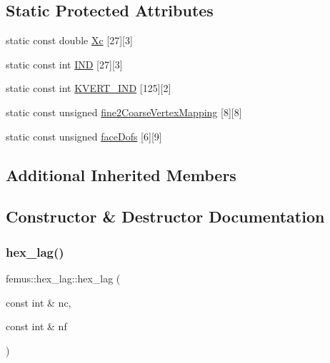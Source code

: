 \subsection*{Static Protected Attributes}
\begin{DoxyCompactItemize}
\item 
static const double \mbox{\hyperlink{classfemus_1_1hex__lag_a09e66c005d5c3e270006ef1694667f2f}{Xc}} \mbox{[}27\mbox{]}\mbox{[}3\mbox{]}
\item 
static const int \mbox{\hyperlink{classfemus_1_1hex__lag_aecbc5fe6a0428eeb352acb8db0c423e7}{I\+ND}} \mbox{[}27\mbox{]}\mbox{[}3\mbox{]}
\item 
static const int \mbox{\hyperlink{classfemus_1_1hex__lag_a088be12e7f39449af87bcb23f7e306c0}{K\+V\+E\+R\+T\+\_\+\+I\+ND}} \mbox{[}125\mbox{]}\mbox{[}2\mbox{]}
\item 
static const unsigned \mbox{\hyperlink{classfemus_1_1hex__lag_a4bfe56640b5c0116ece86418e8a4e1be}{fine2\+Coarse\+Vertex\+Mapping}} \mbox{[}8\mbox{]}\mbox{[}8\mbox{]}
\item 
static const unsigned \mbox{\hyperlink{classfemus_1_1hex__lag_a1f639d4d846dc3dee218811480317e03}{face\+Dofs}} \mbox{[}6\mbox{]}\mbox{[}9\mbox{]}
\end{DoxyCompactItemize}
\subsection*{Additional Inherited Members}


\subsection{Constructor \& Destructor Documentation}
\mbox{\label{classfemus_1_1hex__lag_a08595500515caff416b69c9ba08e7508}} 
\subsubsection{\texorpdfstring{hex\+\_\+lag()}{hex\_lag()}}
{\footnotesize\ttfamily femus\+::hex\+\_\+lag\+::hex\+\_\+lag (\begin{DoxyParamCaption}\item[{const int \&}]{nc,  }\item[{const int \&}]{nf }\end{DoxyParamCaption})\hspace{0.3cm}{\ttfamily [inline]}}



